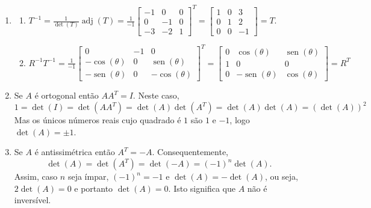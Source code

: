 \documentclass[12pt,a4paper]{article}
\newcommand*\sen{\operatorname{sen}}
\newcommand*\adj[1]{\operatorname{adj}\left(#1\right)}
\begin{document}
\begin{enumerate}
\item
\begin{enumerate}
\item $\displaystyle T^{-1}
= \frac{1}{\det(T)} \adj{T}
= \frac{1}{-1} \begin{bmatrix}
-1 &  0 & 0 \\
 0 & -1 & 0 \\
-3 & -2 & 1
\end{bmatrix}^T
= \begin{bmatrix}
1 & 0 & 3 \\
0 & 1 & 2 \\
0 & 0 & -1
\end{bmatrix}
= T$.
\item $R^{-1}
\displaystyle T^{-1}
= \frac{1}{-1} \begin{bmatrix}
0 & -1 & 0 \\
-\cos(\theta) & 0 & \sen(\theta) \\
-\sen(\theta) & 0 & -\cos(\theta)
\end{bmatrix}^T
= \begin{bmatrix}
0 & \cos(\theta) & \sen(\theta) \\
1 & 0 & 0 \\
0 & -\sen(\theta) & \cos(\theta)
\end{bmatrix}
=R^T$
\end{enumerate}
\item Se $A$ é ortogonal então $A A^T = I$. Neste caso,
\[
1
= \det(I)
= \det(A A^T)
= \det(A) \det( A^T)
= \det(A) \det( A )
= ( \det(A) )^2
\]
Mas os únicos números reais cujo quadrado é $1$ são $1$ e $-1$, logo $\det(A) = \pm1$.

\item Se $A$ é antissimétrica então $A^T = -A$. Consequentemente,
\[
\det(A)
= \det(A^T)
= \det( -A )
= (-1)^n \det(A).
\]
Assim, caso $n$ seja ímpar, $(-1)^n = -1$ e $\det(A) = -\det(A)$, ou seja, $2\det(A) = 0$ e portanto $\det(A) = 0$. Isto significa que $A$ não é inversível.


\end{enumerate}
\end{document}
